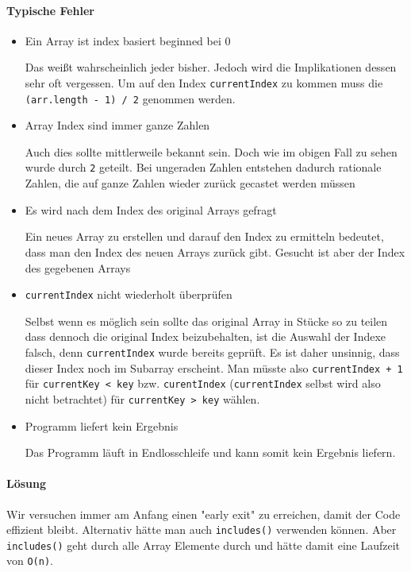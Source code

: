 \documentclass{book}
\begin{document}
\paragraph{Typische Fehler}
\begin{itemize} 
	\item Ein Array ist index basiert beginned bei 0
	
	Das weißt wahrscheinlich jeder bisher. Jedoch wird die Implikationen dessen sehr oft vergessen. Um auf den Index \lstinline|currentIndex| zu kommen muss die \lstinline|(arr.length - 1) / 2| genommen werden.
	\item Array Index sind immer ganze Zahlen
	
	Auch dies sollte mittlerweile bekannt sein. Doch wie im obigen Fall zu sehen wurde durch \lstinline|2| geteilt. Bei ungeraden Zahlen entstehen dadurch rationale Zahlen, die auf ganze Zahlen wieder zurück gecastet werden müssen
	
	\item Es wird nach dem Index des original Arrays gefragt
	
	Ein neues Array zu erstellen und darauf den Index zu ermitteln bedeutet, dass man den Index des neuen Arrays zurück gibt. Gesucht ist aber der Index des gegebenen Arrays
	\item \lstinline|currentIndex| nicht wiederholt überprüfen
	
	Selbst wenn es möglich sein sollte das original Array in Stücke so zu teilen dass dennoch die original Index beizubehalten, ist die Auswahl der Indexe falsch, denn \lstinline|currentIndex| wurde bereits geprüft. Es ist daher unsinnig, dass dieser Index noch im Subarray erscheint. Man müsste also \lstinline|currentIndex + 1| für \lstinline|currentKey < key| bzw. \lstinline|curentIndex| (\lstinline|currentIndex| selbst wird also nicht betrachtet) für \lstinline|currentKey > key| wählen.
	
	\item Programm liefert kein Ergebnis
	
	Das Programm läuft in Endlosschleife und kann somit kein Ergebnis liefern.
	
\end{itemize}
\paragraph{Lösung}
Wir versuchen immer am Anfang einen "early exit" zu erreichen, damit der Code effizient bleibt. Alternativ hätte man auch \lstinline|includes()| verwenden können. Aber \lstinline|includes()| geht durch alle Array Elemente durch und hätte damit eine Laufzeit von \lstinline|O(n)|. 
\end{document}
